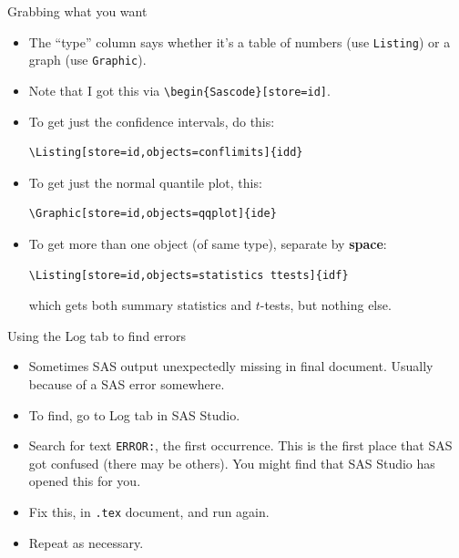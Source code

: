 \documentclass[unknownkeysallowed]{beamer}\usepackage[]{graphicx}\usepackage[]{color}
\begin{document}
\begin{frame}[fragile]{Grabbing what you want}
  
  \begin{itemize}
  \item The ``type'' column says whether it's a table of numbers (use
    \texttt{Listing}) or a graph (use \texttt{Graphic}). 
  \item Note that I got this via
    \verb+\begin{Sascode}[store=id]+.
  \item To get just the confidence intervals, do this:
\begin{verbatim}
\Listing[store=id,objects=conflimits]{idd}
\end{verbatim}
    
  \item To get just the normal quantile plot, this:
\begin{verbatim}
\Graphic[store=id,objects=qqplot]{ide}
\end{verbatim}
    
  \item     To get more than one object (of same type), separate by \textbf{space}:
    
\begin{verbatim}
\Listing[store=id,objects=statistics ttests]{idf}
\end{verbatim}
    which gets both summary statistics and $t$-tests, but nothing else.
  \end{itemize}
  
\end{frame}

\begin{frame}[fragile]{Using the Log tab to find errors}
  
  \begin{itemize}
  \item Sometimes SAS output unexpectedly missing in final
    document. Usually because of a SAS error somewhere.
  \item To find, go to Log tab in SAS Studio.
  \item Search for text \texttt{ERROR:}, the first occurrence. This is
    the first place that SAS got confused (there may be others). You
    might find that SAS Studio has opened this for you.
  \item Fix this, in \texttt{.tex} document, and run again.
  \item Repeat as necessary.
  \end{itemize}
  
\end{frame}
\end{document}
